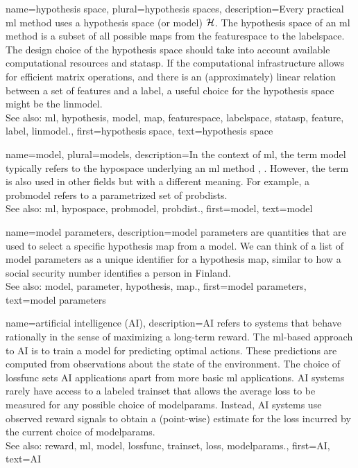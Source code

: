{name={hypothesis space}, plural={hypothesis spaces}, 
	description={Every 
		practical \gls{ml} method uses a \gls{hypothesis} space (or \gls{model}) $\mathcal{H}$. The \gls{hypothesis} space 
		of an \gls{ml} method is a subset of all possible \glspl{map} from the \gls{featurespace} to the \gls{labelspace}. 
		The design choice of the \gls{hypothesis} space should take into account available computational resources and 
		\gls{statasp}. If the computational infrastructure allows for efficient matrix operations, and there 
		is an (approximately) linear relation between a set of \glspl{feature} and a \gls{label}, a useful choice for the 
		\gls{hypothesis} space might be the \gls{linmodel}.
				\\
		See also: \gls{ml}, \gls{hypothesis}, \gls{model}, \gls{map}, \gls{featurespace}, \gls{labelspace}, \gls{statasp}, \gls{feature}, \gls{label}, \gls{linmodel}.},
	first={hypothesis space},
	text={hypothesis space} 
}

	
{name={model}, plural={models}, 
	description={In the context of \gls{ml}, 
		the term model typically refers to the \gls{hypospace} underlying an 
		\gls{ml} method \cite{MLBasics}, \cite{ShalevMLBook}. However, the term is also used in other 
		fields but with a different meaning. For example, a \gls{probmodel} refers to a parametrized 
		set of \glspl{probdist}.
				\\
		See also: \gls{ml}, \gls{hypospace}, \gls{probmodel}, \gls{probdist}.},
	first={model},
	text={model} 
}

{name={model parameters}, 
	description={\Gls{model} \glspl{parameter} are quantities that 
		are used to select a specific \gls{hypothesis} \gls{map} from a \gls{model}. 
		We can think of a list of \gls{model} \glspl{parameter} as a unique identifier for a \gls{hypothesis} 
		\gls{map}, similar to how a social security number identifies a person in Finland.
			\\
		See also: \gls{model}, \gls{parameter}, \gls{hypothesis}, \gls{map}.},
	first={model parameters},
	text={model parameters} 
}

{name={artificial intelligence (AI)}, 
	description={AI refers to systems that behave rationally in the sense of 
		maximizing a long-term \gls{reward}. The \gls{ml}-based approach to AI is to train a \gls{model} for  
		predicting optimal actions. These \glspl{prediction} are computed from observations about the state of the 
		environment. The choice of \gls{lossfunc} sets AI applications apart from more basic \gls{ml} applications. 
		AI systems rarely have access to a labeled \gls{trainset} that allows the average \gls{loss} to be measured for any possible choice of \gls{modelparams}. 
		Instead, AI systems use observed \gls{reward} signals to obtain a (point-wise) estimate for the 
		\gls{loss} incurred by the current choice of \gls{modelparams}.
				\\
		See also: \gls{reward}, \gls{ml}, \gls{model}, \gls{lossfunc}, \gls{trainset}, \gls{loss}, \gls{modelparams}.},
	first={AI},
	text={AI} 
}

